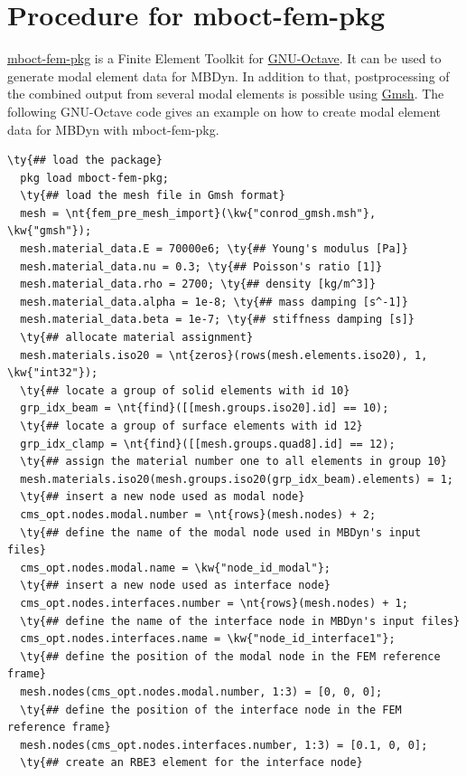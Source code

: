 \section{Procedure for mboct-fem-pkg}
\label{sec:APP:EL:STRUCT:JOINT:MODAL:MBOCTFEMPKG}
\href{https://github.com/octave-user/mboct-fem-pkg}{mboct-fem-pkg} is a Finite Element Toolkit for \href{https://gnu.org/software/octave}{GNU-Octave}. It can be used to generate modal element data for MBDyn. In addition to that, postprocessing of the combined output from several modal elements is possible using \href{http://www.gmsh.info/}{Gmsh}. The following GNU-Octave code gives an example on how to create modal element data for MBDyn with mboct-fem-pkg.
\begin{Verbatim}[commandchars=\\\{\}]
  \ty{## load the package}
  pkg load mboct-fem-pkg; 
  \ty{## load the mesh file in Gmsh format}
  mesh = \nt{fem_pre_mesh_import}(\kw{"conrod_gmsh.msh"}, \kw{"gmsh"}); 
  mesh.material_data.E = 70000e6; \ty{## Young's modulus [Pa]}
  mesh.material_data.nu = 0.3; \ty{## Poisson's ratio [1]}
  mesh.material_data.rho = 2700; \ty{## density [kg/m^3]}
  mesh.material_data.alpha = 1e-8; \ty{## mass damping [s^-1]}
  mesh.material_data.beta = 1e-7; \ty{## stiffness damping [s]}
  \ty{## allocate material assignment}
  mesh.materials.iso20 = \nt{zeros}(rows(mesh.elements.iso20), 1, \kw{"int32"});
  \ty{## locate a group of solid elements with id 10}
  grp_idx_beam = \nt{find}([[mesh.groups.iso20].id] == 10);
  \ty{## locate a group of surface elements with id 12}
  grp_idx_clamp = \nt{find}([[mesh.groups.quad8].id] == 12);
  \ty{## assign the material number one to all elements in group 10}
  mesh.materials.iso20(mesh.groups.iso20(grp_idx_beam).elements) = 1;
  \ty{## insert a new node used as modal node}
  cms_opt.nodes.modal.number = \nt{rows}(mesh.nodes) + 2;
  \ty{## define the name of the modal node used in MBDyn's input files}
  cms_opt.nodes.modal.name = \kw{"node_id_modal"};
  \ty{## insert a new node used as interface node}
  cms_opt.nodes.interfaces.number = \nt{rows}(mesh.nodes) + 1;
  \ty{## define the name of the interface node in MBDyn's input files}
  cms_opt.nodes.interfaces.name = \kw{"node_id_interface1"};
  \ty{## define the position of the modal node in the FEM reference frame}
  mesh.nodes(cms_opt.nodes.modal.number, 1:3) = [0, 0, 0];
  \ty{## define the position of the interface node in the FEM reference frame}
  mesh.nodes(cms_opt.nodes.interfaces.number, 1:3) = [0.1, 0, 0];
  \ty{## create an RBE3 element for the interface node}

\end{Verbatim}
